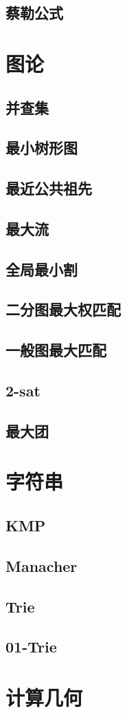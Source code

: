 \documentclass{article}
\begin{document}
\subsection{蔡勒公式}

\section{图论}
\subsection{并查集}

\subsection{最小树形图}
\subsection{最近公共祖先}
\subsection{最大流}
\subsection{全局最小割}
\subsection{二分图最大权匹配}
\subsection{一般图最大匹配}
\subsection{2-sat}
\subsection{最大团}

\section{字符串}
\subsection{KMP}
\subsection{Manacher}
\subsection{Trie}
\subsection{01-Trie}

\section{计算几何}
\end{document}
